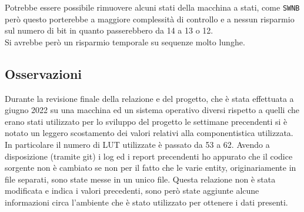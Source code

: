 \documentclass[12pt, a4paper]{article}
\begin{document}
\noindent Potrebbe essere possibile rimuovere alcuni stati della macchina a stati, come \texttt{SWNB}
però questo porterebbe a maggiore complessità di controllo e a nessun risparmio sul numero di bit in quanto passerebbero
da 14 a 13 o 12.\\
Si avrebbe però un risparmio temporale su sequenze molto lunghe.

\subsection{Osservazioni}
\label{sec:oss}
\noindent Durante la revisione finale della relazione e del progetto, che è stata effettuata a giugno 2022 su una macchina ed un sistema operativo
diversi rispetto a quelli che erano stati utilizzato per lo sviluppo del progetto le settimane precendenti 
si è notato un leggero scostamento dei valori relativi alla componentistica utilizzata.
In particolare il numero di LUT utilizzate è passato da 53 a 62.
Avendo a disposizione (tramite git) i log ed i report precendenti ho appurato che il codice sorgente non è cambiato se non per
il fatto che le varie entity, originariamente in file separati, sono state messe in un unico file.
Questa relazione non è stata modificata e indica i valori precedenti, 
sono però state aggiunte alcune informazioni circa l'ambiente che è stato utilizzato per ottenere i dati presenti. 
\end{document}
